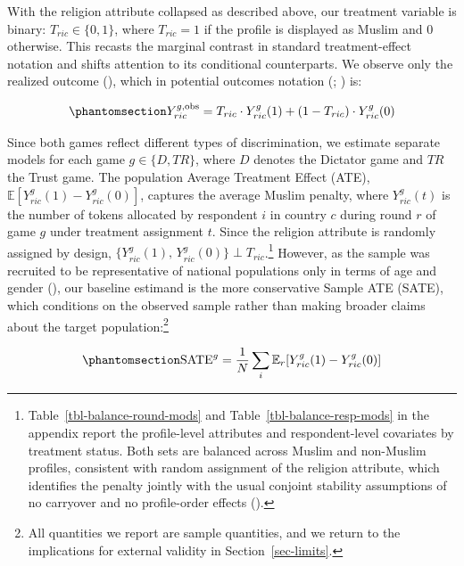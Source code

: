 \documentclass[
  10pt,
  a4paper,
  DIV=11,
  numbers=noendperiod]{scrartcl}
\begin{document}
With the religion attribute collapsed as described above, our treatment
variable is binary: \(T_{ric} \in \{0,1\}\), where \(T_{ric} = 1\) if
the profile is displayed as Muslim and 0 otherwise. This recasts the
marginal contrast in standard treatment-effect notation and shifts
attention to its conditional counterparts. We observe only the realized
outcome (), which in
potential outcomes notation
(;
) is:

\begin{equation}\protect\phantomsection\label{eq-observed}{
Y_{ric}^{g,\text{obs}} =
T_{ric} \cdot Y_{ric}^{g}(1) + (1 - T_{ric}) \cdot Y_{ric}^{g}(0)
}\end{equation}

Since both games reflect different types of discrimination, we estimate
separate models for each game \(g \in \{D, TR\}\), where \(D\) denotes
the Dictator game and \(TR\) the Trust game. The population Average
Treatment Effect (ATE), \(\mathbb{E}[Y_{ric}^{g}(1) - Y_{ric}^{g}(0)]\),
captures the average Muslim penalty, where \(Y_{ric}^{g}(t)\) is the
number of tokens allocated by respondent \(i\) in country \(c\) during
round \(r\) of game \(g\) under treatment assignment \(t\). Since the
religion attribute is randomly assigned by design,
\(\{Y_{ric}^{g}(1),\, Y_{ric}^{g}(0)\}  \perp T_{ric}\).\footnote{Table~\ref{tbl-balance-round-mods}
  and Table~\ref{tbl-balance-resp-mods} in the appendix report the
  profile-level attributes and respondent-level covariates by treatment
  status. Both sets are balanced across Muslim and non-Muslim profiles,
  consistent with random assignment of the religion attribute, which
  identifies the penalty jointly with the usual conjoint stability
  assumptions of no carryover and no profile-order effects
  ().}
However, as the sample was recruited to be representative of national
populations only in terms of age and gender
(), our baseline
estimand is the more conservative Sample ATE (SATE), which conditions on
the observed sample rather than making broader claims about the target
population:\footnote{All quantities we report are sample quantities, and
  we return to the implications for external validity in
  Section~\ref{sec-limits}.}

\begin{equation}\protect\phantomsection\label{eq-sate}{
    \text{SATE}^{g} =
        \frac{1}{N} \sum_{i}
        \mathbb{E}_{r}\!\left[Y_{ric}^{g}(1) - Y_{ric}^{g}(0)\right]
}\end{equation}
\end{document}
